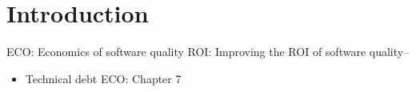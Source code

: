 
\chapter{Introduction}
 
 ECO: Economics of software quality
 ROI: Improving the ROI of software quality--
 
 \begin{itemize}




 \item Technical debt ECO: Chapter 7
 
 \end{itemize} 
